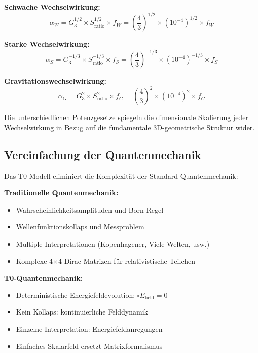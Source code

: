 \documentclass[12pt,a4paper]{report}
\begin{document}
	\textbf{Schwache Wechselwirkung:}
	\begin{equation}
		\alpha_W = G_3^{1/2} \times S_{\text{ratio}}^{1/2} \times f_W = \left(\frac{4}{3}\right)^{1/2} \times (10^{-4})^{1/2} \times f_W
	\end{equation}
	
	\textbf{Starke Wechselwirkung:}
	\begin{equation}
		\alpha_S = G_3^{-1/3} \times S_{\text{ratio}}^{-1/3} \times f_S = \left(\frac{4}{3}\right)^{-1/3} \times (10^{-4})^{-1/3} \times f_S
	\end{equation}
	
	\textbf{Gravitationswechselwirkung:}
	\begin{equation}
		\alpha_G = G_3^2 \times S_{\text{ratio}}^2 \times f_G = \left(\frac{4}{3}\right)^2 \times (10^{-4})^2 \times f_G
	\end{equation}
	
	Die unterschiedlichen Potenzgesetze spiegeln die dimensionale Skalierung jeder Wechselwirkung in Bezug auf die fundamentale 3D-geometrische Struktur wider.
	
	\subsection{Vereinfachung der Quantenmechanik}
	\label{subsec:quantum_mechanics_simplification}
	
	Das T0-Modell eliminiert die Komplexität der Standard-Quantenmechanik:
	
	\textbf{Traditionelle Quantenmechanik:}
	\begin{itemize}
		\item Wahrscheinlichkeitsamplituden und Born-Regel
		\item Wellenfunktionskollaps und Messproblem
		\item Multiple Interpretationen (Kopenhagener, Viele-Welten, usw.)
		\item Komplexe 4×4-Dirac-Matrizen für relativistische Teilchen
	\end{itemize}
	
	\textbf{T0-Quantenmechanik:}
	\begin{itemize}
		\item Deterministische Energiefeldevolution: $\square E_{\text{field}} = 0$
		\item Kein Kollaps: kontinuierliche Felddynamik
		\item Einzelne Interpretation: Energiefeldanregungen
		\item Einfaches Skalarfeld ersetzt Matrixformalismus
	\end{itemize}
	
\end{document}
